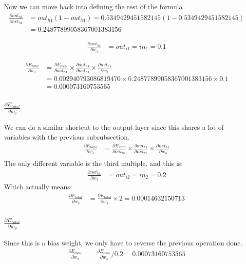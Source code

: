 \documentclass{article}
\begin{document}
Now we can move back into defining the rest of the formula
\begin{align*}
    \frac{\partial out_{h1}}{\partial net_{h1}} & =
    out_{h1}(1 - out_{h1}) = 0.5349429451582145(1-0.5349429451582145) \\
    & = 0.24877899058367001383156
\end{align*}

\begin{align*}
    \frac{\partial net_{h1}}{\partial w_1} & = 
    out_{i1} = in_{1} = 0.1
\end{align*}

\begin{align*}
    \frac{\partial E_{total}}{\partial w_1} & =
    \frac{\partial E_{total}}{\partial out_{h1}} \times
    \frac{\partial out_{h1}}{\partial net_{h1}} \times
    \frac{\partial net_{h1}}{\partial w_1} \\
    & = 0.002940793086819470 \times 0.24877899058367001383156 \times 0.1 \\
    & = 0.000073160753565
\end{align*}

\subsubsection{$\frac{\partial E_{total}}{\partial w_3}$}
We can do a similar shortcut to the output layer since this shares a lot of
variables with the previous subsubsection.
\begin{align*} 
    \frac{\partial E_{total}}{\partial w_3} & =
    \frac{\partial E_{total}}{\partial out_{h1}} \times
    \frac{\partial out_{h1}}{\partial net_{h1}} \times
    \frac{\partial net_{h1}}{\partial w_3} \\
\end{align*}
The only different variable is the third multiple, and this is:
\begin{align*}
    \frac{\partial net_{h1}}{\partial w_3} & = 
    out_{i2} = in_{2} = 0.2
\end{align*}
Which actually means:
\begin{align*} 
    \frac{\partial E_{total}}{\partial w_3} & =
    \frac{\partial E_{total}}{\partial w_1} \times 2 =
    0.00014632150713
\end{align*}

\subsubsection{$\frac{\partial E_{total}}{\partial w_9}$}
Since this is a bias weight, we only have to reverse the previous operation done.
\begin{align*} 
    \frac{\partial E_{total}}{\partial w_9} & =
    \frac{\partial E_{total}}{\partial w_3} / 0.2 =
    0.00073160753565
\end{align*}
\end{document}
